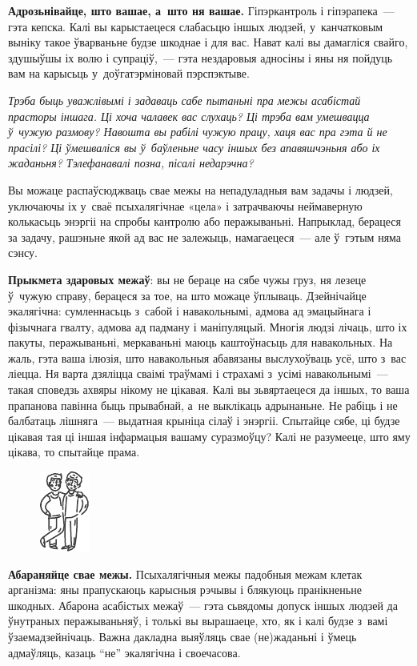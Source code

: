 \textbf{Адрозьнівайце, што вашае, а~што ня вашае.} Гіпэркантроль і гіпэрапека~--- гэта кепска. Калі вы карыстаецеся слабасьцю іншых людзей, у~канчатковым выніку такое ўварваньне будзе шкоднае і для вас. Нават калі вы дамагліся свайго, здушыўшы іх волю і супраціў,~--- гэта нездаровыя адносіны і яны ня пойдуць вам на карысьць у~доўгатэрміновай пэрспэктыве.

\emph{Трэба быць уважлівымі і задаваць сабе пытаньні пра межы асабістай прасторы іншага. Ці хоча чалавек вас слухаць? Ці трэба вам умешвацца ў~чужую размову? Навошта вы рабілі чужую працу, хаця вас пра гэта й не прасілі? Ці ўмешваліся вы ў~баўленьне часу іншых без апавяшчэньня або іх жаданьня? Тэлефанавалі позна, пісалі недарэчна?}

Вы можаце распаўсюджваць свае межы на непадуладныя вам задачы і людзей, уключаючы іх у~сваё псыхалягічнае «цела» і затрачваючы неймаверную колькасьць энэргіі на спробы кантролю або перажываньні. Напрыклад, берацеся за задачу, рашэньне якой ад вас не залежыць, намагаецеся~--- але ў~гэтым няма сэнсу. 

\textbf{Прыкмета здаровых межаў}: вы не бераце на сябе чужы груз, ня лезеце ў~чужую справу, берацеся за тое, на што можаце ўплываць. Дзейнічайце экалягічна: сумленнасьць з~сабой і навакольнымі, адмова ад эмацыйнага і фізычнага гвалту, адмова ад падману і маніпуляцый. Многія людзі лічаць, што іх пакуты, перажываньні, меркаваньні маюць каштоўнасьць для навакольных. На жаль, гэта ваша ілюзія, што навакольныя абавязаны выслухоўваць усё, што з~вас ліецца. Ня варта дзяліцца сваімі траўмамі і страхамі з~усімі навакольнымі~--- такая споведзь ахвяры нікому не цікавая. Калі вы зьвяртаецеся да іншых, то ваша прапанова павінна быць прывабнай, а~не выклікаць адрынаньне. Не рабіць і не балбатаць лішняга~--- выдатная крыніца сілаў і энэргіі. Спытайце сябе, ці будзе цікавая тая ці іншая інфармацыя вашаму суразмоўцу? Калі не разумееце, што яму цікава, то спытайце прама.

\begin{figure}[htb!]
  \centering
  \includegraphics[scale=1.5]{willpower/ch10/9.pdf}
\end{figure}

\textbf{Абараняйце свае межы.} Псыхалягічныя межы падобныя межам клетак арганізма: яны прапускаюць карысныя рэчывы і блякуюць пранікненьне шкодных. Абарона асабістых межаў~--- гэта сьвядомы допуск іншых людзей да ўнутраных перажываньняў, і толькі вы вырашаеце, хто, як і калі будзе з~вамі ўзаемадзейнічаць. Важна дакладна выяўляць свае (не)жаданьні і ўмець адмаўляць, казаць ``не'' экалягічна і своечасова.

